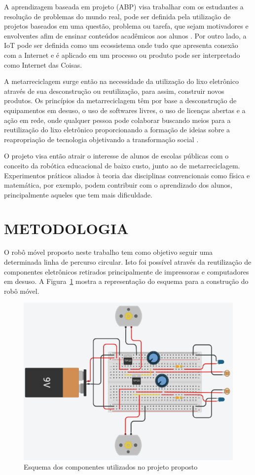 \documentclass[a0,portrait,brazil]{a0poster}
\begin{document}
\begin{multicols}{3}
\begin{large}
A aprendizagem baseada em projeto (ABP) visa trabalhar com os estudantes a resolução de problemas do mundo real, pode ser definida pela utilização de projetos baseados em uma questão, problema ou tarefa, que sejam motivadores e envolventes afim de ensinar conteúdos acadêmicos aos alunos \cite{abp}. Por outro lado, a IoT pode ser definida como um ecossistema onde tudo que apresenta conexão com a Internet e é aplicado em um processo ou produto pode ser interpretado como Internet das Coisas.
\medskip

A metarreciclagem surge então na necessidade da utilização do lixo eletrônico através de sua desconstrução ou reutilização, para assim, construir novos produtos. Os princípios da metarreciclagem têm por base a desconstrução de equipamentos em desuso, o uso de softwares livres, o uso de licenças abertas e a ação em rede, onde qualquer pessoa pode colaborar buscando meios para a reutilização do lixo eletrônico proporcionando a formação de ideias sobre a reapropriação de tecnologia objetivando a transformação social \cite{robo2}.
\medskip

O projeto visa então atrair o interesse de alunos de escolas públicas com o conceito da robótica educacional de baixo custo, junto ao de metarreciclagem. Experimentos práticos aliados à teoria das disciplinas convencionais como física e matemática, por exemplo, podem contribuir com o aprendizado dos alunos, principalmente aqueles que tem mais dificuldade.

\color{black} 
\section*{METODOLOGIA}

O robô móvel proposto neste trabalho tem como objetivo seguir uma determinada linha de percurso circular. Isto foi possível através da reutilização de componentes eletrônicos retirados principalmente de impressoras e computadores em desuso. A Figura~\ref{fig:fig1} mostra a representação do esquema para a construção do robô móvel.
\medskip

\begin{figure}[H]
\centering
\includegraphics[width=.2\textwidth]{figures/SEMIC1.png}
\caption{Esquema dos componentes utilizados no projeto proposto}
\label{fig:fig1}
\end{figure}


\end{large}
\end{multicols}
\end{document}
